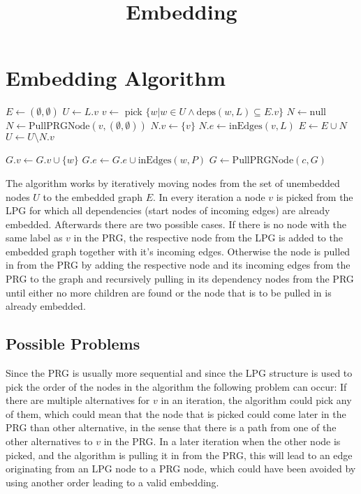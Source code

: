 \documentclass[a4paper]{article}
\title{Embedding}
\date{}
\author{}
\begin{document}
\maketitle
\section{Embedding Algorithm}
\begin{algorithmic}
    \State $E \gets (\emptyset,\emptyset)$
    \State $U \gets L.v$
      \State $v \gets$ pick $\{w|w \in U \land \mathrm{deps}(w,L) \subseteq E.v\}$
      \State $N \gets \mathrm{null}$
       
        \State $N \gets \mathrm{PullPRGNode}(v,(\emptyset,\emptyset))$
      \EndIf
       
        \State $N.v \gets \{v\}$
        \State $N.e \gets \mathrm{inEdges}(v,L)$
      \EndIf
      \State $E \gets E \cup N$
      \State $U \gets U \setminus N.v$
    \EndWhile
    \State {}

    \State
        \State $G.v \gets G.v \cup \{w\}$
        \State $G.e \gets G.e \cup \mathrm{inEdges}(w,P)$
          \State $G \gets \mathrm{PullPRGNode}(c,G)$
        \EndFor
      \EndIf
      \State {}
    \EndFunction
  \EndFunction
\end{algorithmic}

The algorithm works by iteratively moving nodes from the set of unembedded nodes
$U$ to the embedded graph $E$. In every iteration a node $v$ is picked from the
LPG for which all dependencies (start nodes of incoming edges) are already
embedded.  Afterwards there are two possible cases. If there is no node with the
same label as $v$ in the PRG, the respective node from the LPG is added to the
embedded graph together with it's incoming edges. Otherwise the node is pulled
in from the PRG by adding the respective node and its incoming edges from the
PRG to the graph and recursively pulling in its dependency nodes from the PRG
until either no more children are found or the node that is to be pulled in is
already embedded.

\subsection{Possible Problems}
Since the PRG is usually more sequential and since the LPG structure is used to
pick the order of the nodes in the algorithm the following problem can occur: If
there are multiple alternatives for $v$ in an iteration, the algorithm could
pick any of them, which could mean that the node that is picked could come
later in the PRG than other alternative, in the sense that there is a path from
one of the other alternatives to $v$ in the PRG. In a later iteration when
the other node is picked, and the algorithm is pulling it in from the PRG, this
will lead to an edge originating from an LPG node to a PRG node, which could
have been avoided by using another order leading to a valid embedding.
\end{document}
